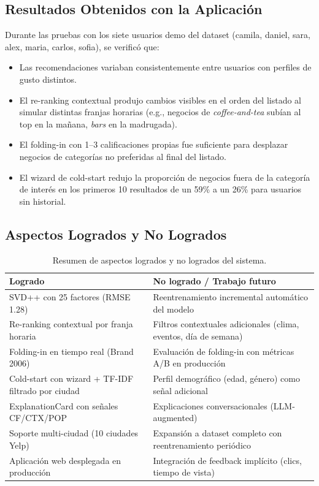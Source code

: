 \documentclass[11pt,a4paper]{article}
\begin{document}
\subsection{Resultados Obtenidos con la Aplicación}

Durante las pruebas con los siete usuarios demo del dataset (camila, daniel, sara, alex, maria, carlos, sofia), se verificó que:

\begin{itemize}
    \item Las recomendaciones variaban consistentemente entre usuarios con perfiles de gusto distintos.
    \item El re-ranking contextual produjo cambios visibles en el orden del listado al simular distintas franjas horarias (e.g., negocios de \textit{coffee-and-tea} subían al top en la mañana, \textit{bars} en la madrugada).
    \item El folding-in con 1–3 calificaciones propias fue suficiente para desplazar negocios de categorías no preferidas al final del listado.
    \item El wizard de cold-start redujo la proporción de negocios fuera de la categoría de interés en los primeros 10 resultados de un 59\% a un 26\% para usuarios sin historial.
\end{itemize}

\subsection{Aspectos Logrados y No Logrados}

\begin{table}[H]
\centering
\begin{tabular}{@{}p{7.5cm}p{7.5cm}@{}}
\toprule
\textbf{Logrado} & \textbf{No logrado / Trabajo futuro} \\ \midrule
SVD++ con 25 factores (RMSE 1.28) & Reentrenamiento incremental automático del modelo \\
Re-ranking contextual por franja horaria & Filtros contextuales adicionales (clima, eventos, día de semana) \\
Folding-in en tiempo real (Brand 2006) & Evaluación de folding-in con métricas A/B en producción \\
Cold-start con wizard + TF-IDF filtrado por ciudad & Perfil demográfico (edad, género) como señal adicional \\
ExplanationCard con señales CF/CTX/POP & Explicaciones conversacionales (LLM-augmented) \\
Soporte multi-ciudad (10 ciudades Yelp) & Expansión a dataset completo con reentrenamiento periódico \\
Aplicación web desplegada en producción & Integración de feedback implícito (clics, tiempo de vista) \\ \bottomrule
\end{tabular}
\caption{Resumen de aspectos logrados y no logrados del sistema.}
\label{tab:logros}
\end{table}
\end{document}
